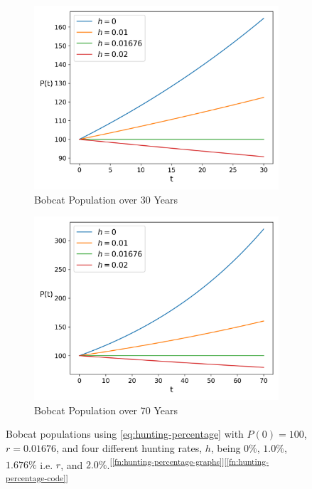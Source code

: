 \documentclass{article}
\begin{document}
\begin{figure}[h]
    \centering
    \begin{subfigure}{.5\textwidth}
        \centering
        \includegraphics[width=.95\linewidth]{./hunting/percentage_short_term.png}
        \caption{Bobcat Population over 30 Years}
        \label{fig:hunting-percentage-short-term}
    \end{subfigure}%
    \begin{subfigure}{.5\textwidth}
        \centering
        \includegraphics[width=.95\linewidth]{./hunting/percentage_long_term.png}
        \caption{Bobcat Population over 70 Years}
        \label{fig:hunting-percentage-long-term}
    \end{subfigure}
    \caption{Bobcat populations using \cref{eq:hunting-percentage} with $P(0) = 100$, $r = 0.01676$, and four different hunting rates, $h$, being $0\%$, $1.0\%$, $1.676\%$ i.e. $r$, and $2.0\%$.\textsuperscript{[\protect\ref{fn:hunting-percentage-graphs}][\protect\ref{fn:hunting-percentage-code}]}}
    \label{fig:2}
\end{figure}
\end{document}
